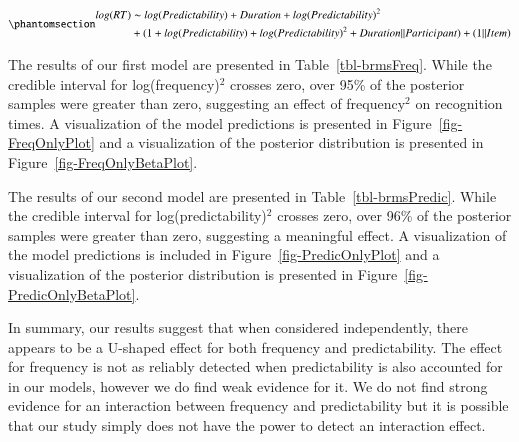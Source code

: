 \documentclass[
  authoryear,
  preprint,
  1p,
  onecolumn]{elsarticle}
\begin{document}
\begin{equation}\phantomsection\label{eq-brmsPredic}{
\begin{aligned}
log(RT) & \sim log(Predictability) + Duration + log(Predictability)^2 \\ & + (1 + log(Predictability) + log(Predictability)^2 + Duration || Participant) + (1 || Item)
\end{aligned}
}\end{equation}

The results of our first model are presented in
Table~\ref{tbl-brmsFreq}. While the credible interval for
log(frequency)\(^2\) crosses zero, over 95\% of the posterior samples
were greater than zero, suggesting an effect of frequency\(^2\) on
recognition times. A visualization of the model predictions is presented
in Figure~\ref{fig-FreqOnlyPlot} and a visualization of the posterior
distribution is presented in Figure~\ref{fig-FreqOnlyBetaPlot}.

The results of our second model are presented in
Table~\ref{tbl-brmsPredic}. While the credible interval for
log(predictability)\(^2\) crosses zero, over 96\% of the posterior
samples were greater than zero, suggesting a meaningful effect. A
visualization of the model predictions is included in
Figure~\ref{fig-PredicOnlyPlot} and a visualization of the posterior
distribution is presented in Figure~\ref{fig-PredicOnlyBetaPlot}.

In summary, our results suggest that when considered independently,
there appears to be a U-shaped effect for both frequency and
predictability. The effect for frequency is not as reliably detected
when predictability is also accounted for in our models, however we do
find weak evidence for it. We do not find strong evidence for an
interaction between frequency and predictability but it is possible that
our study simply does not have the power to detect an interaction
effect.

\begin{table}

\caption{\label{tbl-gamModelTab}Model results for the generalized
Additive Mixed Model cotanining only the interaction between frequency
and predictability.}


\end{table}%
\end{document}
